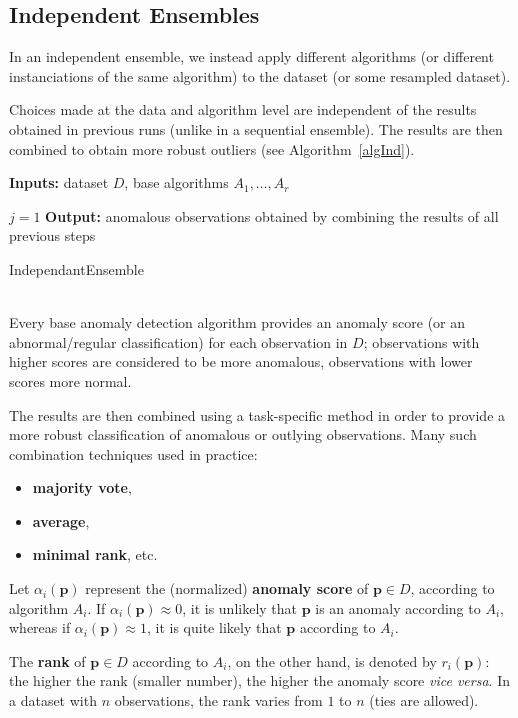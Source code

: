 \subsection*{Independent Ensembles}
In an independent ensemble, we instead apply different algorithms (or different instanciations of the same algorithm) to the dataset (or some resampled dataset). \par Choices made at the data and algorithm level
are independent of the results obtained in previous runs (unlike in a sequential ensemble). The results are then combined to obtain more robust outliers (see Algorithm~\ref{algInd}).

\begin{algorithm}[t]
\SetAlgoLined
\textbf{Inputs:} dataset $D$, base algorithms $A_1,\ldots,A_r$ 

$j=1$\;
\textbf{Output:} anomalous observations obtained by combining the results of all previous steps 
\caption{IndependantEnsemble}\label{algInd}
\end{algorithm}
\ \\
\noindent Every base anomaly detection algorithm provides an a\-no\-ma\-ly score (or an abnormal/regular classification) for each observation in $D$; observations with higher scores are considered to be more anomalous, observations with lower scores more normal. \par The results are then combined using a task-specific method in order to provide a more robust classification of anomalous or outlying observations. 
\newl Many such combination techniques used in practice:  \begin{itemize}[noitemsep]
\item \textbf{majority vote}, 
\item \textbf{average}, 
\item \textbf{minimal rank}, etc. \end{itemize}  
Let $\alpha_i(\mathbf{p})$ represent the (normalized) \textbf{anomaly score} of $\mathbf{p}\in D$, according to algorithm $A_i$. If $\alpha_i(\mathbf{p})\approx 0$, it is unlikely that $\mathbf{p}$ is an anomaly according to $A_i$, whereas if $\alpha_i(\mathbf{p})\approx 1$, it is quite likely that $\mathbf{p}$ according to $A_i$. \par The \textbf{rank} of $\mathbf{p}\in D$ according to $A_i$, on the other hand, is denoted by $r_i(\mathbf{p})$: the higher the rank (smaller number), the higher the anomaly score  \textit{vice versa}. In a dataset with  $n$ observations, the rank varies from $1$ to $n$ (ties are allowed). 
